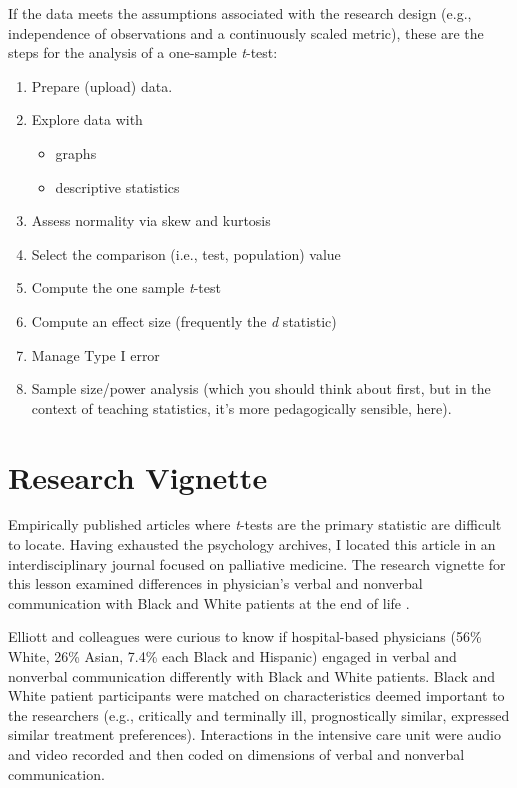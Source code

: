 \documentclass[
  11pt,
]{book}
\providecommand{\tightlist}{%
  \setlength{\itemsep}{0pt}\setlength{\parskip}{0pt}}
\begin{document}
If the data meets the assumptions associated with the research design (e.g., independence of observations and a continuously scaled metric), these are the steps for the analysis of a one-sample \emph{t}-test:

\begin{enumerate}
\def\labelenumi{\arabic{enumi}.}
\tightlist
\item
  Prepare (upload) data.
\item
  Explore data with

  \begin{itemize}
  \tightlist
  \item
    graphs
  \item
    descriptive statistics
  \end{itemize}
\item
  Assess normality via skew and kurtosis
\item
  Select the comparison (i.e., test, population) value
\item
  Compute the one sample \emph{t}-test
\item
  Compute an effect size (frequently the \emph{d} statistic)
\item
  Manage Type I error
\item
  Sample size/power analysis (which you should think about first, but in the context of teaching statistics, it's more pedagogically sensible, here).
\end{enumerate}

\hypertarget{research-vignette-1}{%
\section{Research Vignette}\label{research-vignette-1}}

Empirically published articles where \emph{t}-tests are the primary statistic are difficult to locate. Having exhausted the psychology archives, I located this article in an interdisciplinary journal focused on palliative medicine. The research vignette for this lesson examined differences in physician's verbal and nonverbal communication with Black and White patients at the end of life \citep{elliott_differences_2016}.

Elliott and colleagues \citeyearpar{elliott_differences_2016} were curious to know if hospital-based physicians (56\% White, 26\% Asian, 7.4\% each Black and Hispanic) engaged in verbal and nonverbal communication differently with Black and White patients. Black and White patient participants were matched on characteristics deemed important to the researchers (e.g., critically and terminally ill, prognostically similar, expressed similar treatment preferences). Interactions in the intensive care unit were audio and video recorded and then coded on dimensions of verbal and nonverbal communication.
\end{document}
